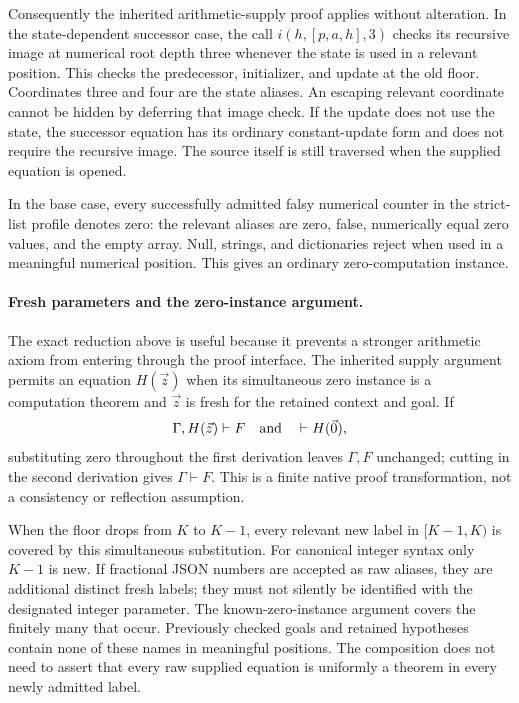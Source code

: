 \documentclass[11pt,letterpaper]{article}
\theoremstyle{definition}\newtheorem{definition}[theorem]{Definition}
\theoremstyle{remark}\newtheorem{remark}[theorem]{Remark}
\begin{document}
Consequently the inherited arithmetic-supply proof applies without
alteration.  In the state-dependent successor case, the call
$i(h,[p,a,h],3)$ checks its recursive image at numerical root depth
three whenever the state is used in a relevant position.  This checks
the predecessor, initializer, and update at the old floor.  Coordinates
three and four are the state aliases.  An escaping relevant coordinate
cannot be hidden by deferring that image check.  If the update does not
use the state, the successor equation has its ordinary constant-update
form and does not require the recursive image.  The source itself is
still traversed when the supplied equation is opened.

In the base case, every successfully admitted falsy numerical counter
in the strict-list profile denotes zero: the relevant aliases are zero,
false, numerically equal zero values, and the empty array.  Null,
strings, and dictionaries reject when used in a meaningful numerical
position.  This gives an ordinary zero-computation instance.

\paragraph{Fresh parameters and the zero-instance argument.}
The exact reduction above is useful because it prevents a stronger
arithmetic axiom from entering through the proof interface.  The
inherited supply argument permits an equation $H(\vec z)$ when its
simultaneous zero instance is a computation theorem and $\vec z$ is
fresh for the retained context and goal.  If
\[
 \Gamma,H(\vec z)\vdash F\quad\hbox{and}\quad\vdash H(\vec0),
\]
substituting zero throughout the first derivation leaves $\Gamma,F$
unchanged; cutting in the second derivation gives $\Gamma\vdash F$.
This is a finite native proof transformation, not a consistency or
reflection assumption.

When the floor drops from $K$ to $K-1$, every relevant new label in
$[K-1,K)$ is covered by this simultaneous substitution.  For canonical
integer syntax only $K-1$ is new.  If fractional JSON numbers are
accepted as raw aliases, they are additional distinct fresh labels;
they must not silently be identified with the designated integer
parameter.  The known-zero-instance argument covers the finitely many
that occur.  Previously checked goals and retained hypotheses contain
none of these names in meaningful positions.  The composition does not
need to assert that every raw supplied equation is uniformly a theorem
in every newly admitted label.
\end{document}
